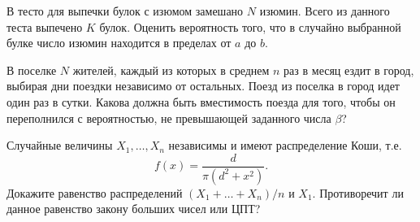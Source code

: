 \begin{problem}
В тесто для выпечки булок с изюмом замешано $N$ изюмин. Всего из данного теста выпечено $K$ булок. Оценить вероятность того, 
что в случайно выбранной булке число изюмин находится в пределах от $a$ до $b$. 
\end{problem}

\begin{problem}
В поселке $N$ жителей, каждый из которых в среднем $n$ раз в месяц ездит в город, выбирая дни поездки независимо от остальных. 
Поезд из поселка в город идет один раз в сутки. Какова должна быть вместимость поезда для того, чтобы он переполнился с вероятностью, 
не превышающей заданного числа $\beta$? 
\end{problem}

\begin{problem}
Случайные величины $X_1,\ldots,X_n$ независимы и имеют распределение Коши, т.е. 
\[
f(x) = \frac{d}{\pi(d^2 + x^2)}.
\]
Докажите равенство распределений $(X_1+\ldots+X_n)/n$ и  $X_1$. Противоречит ли данное равенство закону больших чисел или ЦПТ?
\end{problem}


